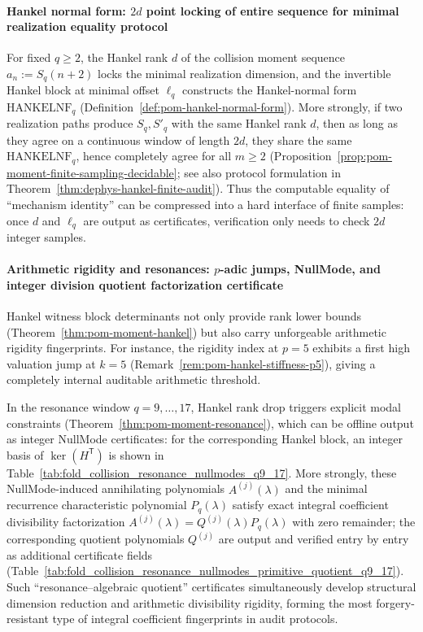 \paragraph{Hankel normal form: \texorpdfstring{$2d$}{2d} point locking of entire sequence for minimal realization equality protocol}
For fixed \(q\ge 2\), the Hankel rank \(d\) of the collision moment sequence \(a_n:=S_q(n+2)\) locks the minimal realization dimension, and the invertible Hankel block at minimal offset \(\ell_q\) constructs the Hankel-normal form
\(\mathrm{HANKELNF}_q\) (Definition~\ref{def:pom-hankel-normal-form}).
More strongly, if two realization paths produce \(S_q,S'_q\) with the same Hankel rank \(d\), then as long as they agree on a continuous window of length \(2d\), they share the same \(\mathrm{HANKELNF}_q\), hence completely agree for all \(m\ge 2\) (Proposition~\ref{prop:pom-moment-finite-sampling-decidable}; see also protocol formulation in Theorem~\ref{thm:dephys-hankel-finite-audit}).
Thus the computable equality of ``mechanism identity'' can be compressed into a hard interface of finite samples: once \(d\) and \(\ell_q\) are output as certificates, verification only needs to check \(2d\) integer samples.

\paragraph{Arithmetic rigidity and resonances: \texorpdfstring{$p$}{p}-adic jumps, NullMode, and integer division quotient factorization certificate}
Hankel witness block determinants not only provide rank lower bounds (Theorem~\ref{thm:pom-moment-hankel}) but also carry unforgeable arithmetic rigidity fingerprints.
For instance, the rigidity index at \(p=5\) exhibits a first high valuation jump at \(k=5\) (Remark~\ref{rem:pom-hankel-stiffness-p5}), giving a completely internal auditable arithmetic threshold.
\par
In the resonance window \(q=9,\dots,17\), Hankel rank drop triggers explicit modal constraints (Theorem~\ref{thm:pom-moment-resonance}), which can be offline output as integer NullMode certificates: for the corresponding Hankel block, an integer basis of \(\ker(H^{\mathsf T})\) is shown in Table~\ref{tab:fold_collision_resonance_nullmodes_q9_17}.
More strongly, these NullMode-induced annihilating polynomials \(A^{(j)}(\lambda)\) and the minimal recurrence characteristic polynomial \(P_q(\lambda)\) satisfy exact integral coefficient divisibility factorization
\(
A^{(j)}(\lambda)=Q^{(j)}(\lambda)P_q(\lambda)
\)
with zero remainder; the corresponding quotient polynomials \(Q^{(j)}\) are output and verified entry by entry as additional certificate fields (Table~\ref{tab:fold_collision_resonance_nullmodes_primitive_quotient_q9_17}).
Such ``resonance–algebraic quotient'' certificates simultaneously develop structural dimension reduction and arithmetic divisibility rigidity, forming the most forgery-resistant type of integral coefficient fingerprints in audit protocols.

